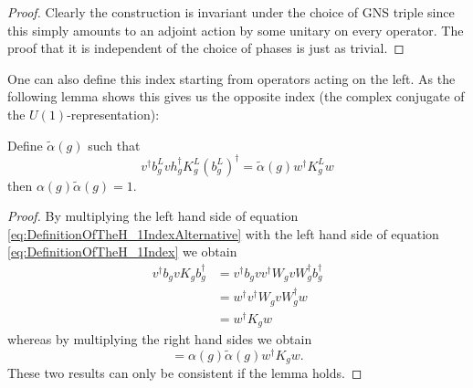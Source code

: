 \documentclass[11pt,a4paper,twoside]{article}
\numberwithin{equation}{section}
\begin{document}
\begin{proof}
	Clearly the construction is invariant under the choice of GNS triple since this simply amounts to an adjoint action by some unitary on every operator. The proof that it is independent of the choice of phases is just as trivial.
\end{proof}
One can also define this index starting from operators acting on the left. As the following lemma shows this gives us the opposite index (the complex conjugate of the $U(1)$-representation):
\begin{lemma}
	Define $\tilde{\alpha}(g)$ such that
	\begin{equation}\label{eq:DefinitionOfTheH_1IndexAlternative}
		v^\dagger b_g^L v h_g^\dagger K_g^L (b_g^L)^\dagger=\tilde{\alpha}(g)w^\dagger K_g^L w
	\end{equation}
	then $\alpha(g)\tilde{\alpha}(g)=1$.
\end{lemma}
\begin{proof}
	By multiplying the left hand side of equation \eqref{eq:DefinitionOfTheH_1IndexAlternative} with the left hand side of equation \eqref{eq:DefinitionOfTheH_1Index} we obtain
	\begin{align}
		v^\dagger b_g v K_g b_g^\dagger&=v^\dagger b_g v v^\dagger W_g v W_g^\dagger b_g^\dagger\\
		&=w^\dagger v^\dagger W_g v W_g^\dagger w\\
		&=w^\dagger K_g w
	\end{align}
	whereas by multiplying the right hand sides we obtain
	\begin{equation}
		=\alpha(g)\tilde{\alpha}(g)w^\dagger K_g w.
	\end{equation}
	These two results can only be consistent if the lemma holds.
\end{proof}
\end{document}

